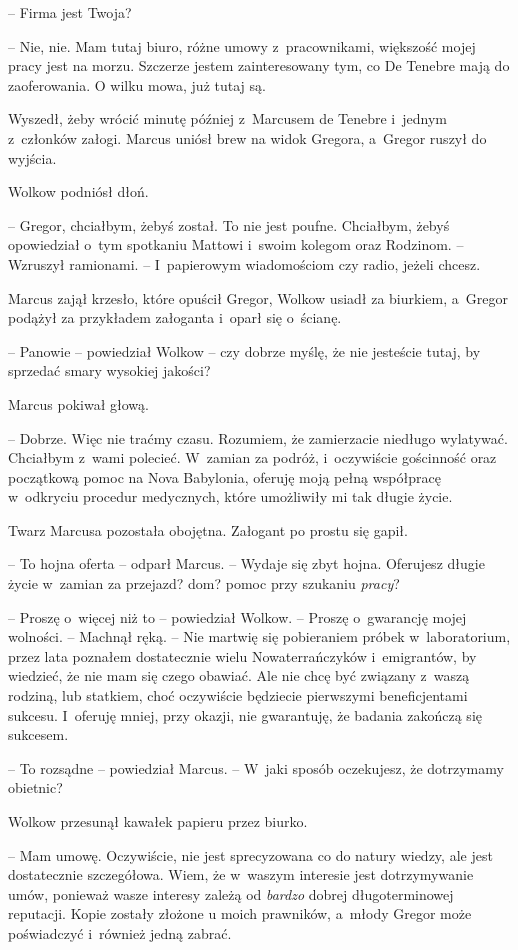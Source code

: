 \documentclass[oneside,polish,12pt,sfheadings]{mwbk}
\begin{document}
-- Firma jest Twoja?

-- Nie, nie. Mam tutaj biuro, różne umowy z~pracownikami, większość
mojej pracy jest na morzu. Szczerze jestem zainteresowany tym, co De
Tenebre mają do zaoferowania. O wilku mowa, już tutaj są.

Wyszedł, żeby wrócić minutę później z~Marcusem de Tenebre i~jednym z~członków załogi. Marcus uniósł brew na widok Gregora, a~Gregor ruszył do
wyjścia.

Wolkow podniósł dłoń. 

-- Gregor, chciałbym, żebyś został. To nie jest
poufne. Chciałbym, żebyś opowiedział o~tym spotkaniu Mattowi i~swoim
kolegom oraz Rodzinom. -- Wzruszył ramionami. -- I~papierowym wiadomościom
czy radio, jeżeli chcesz.

Marcus zajął krzesło, które opuścił Gregor, Wolkow usiadł za biurkiem, a~Gregor podążył za przykładem załoganta i~oparł się o~ścianę.

-- Panowie -- powiedział Wolkow -- czy dobrze myślę, że nie jesteście
tutaj, by sprzedać smary wysokiej jakości?

Marcus pokiwał głową.

-- Dobrze. Więc nie traćmy czasu. Rozumiem, że zamierzacie niedługo
wylatywać. Chciałbym z~wami polecieć. W~zamian za podróż, i~oczywiście
gościnność oraz początkową pomoc na Nova Babylonia, oferuję moją pełną
współpracę w~odkryciu procedur medycznych, które umożliwiły mi tak
długie życie.

Twarz Marcusa pozostała obojętna. Załogant po prostu się gapił.

-- To hojna oferta -- odparł Marcus. -- Wydaje się zbyt hojna. Oferujesz
długie życie w~zamian za przejazd? dom? pomoc przy szukaniu
\emph{pracy}?

-- Proszę o~więcej niż to -- powiedział Wolkow. -- Proszę o~gwarancję mojej
wolności. -- Machnął ręką. -- Nie martwię się pobieraniem próbek w~laboratorium, przez lata poznałem dostatecznie wielu Nowaterrańczyków i~emigrantów, by wiedzieć, że nie mam się czego obawiać. Ale nie chcę być
związany z~waszą rodziną, lub statkiem, choć oczywiście będziecie
pierwszymi beneficjentami sukcesu. I~oferuję mniej, przy okazji, nie
gwarantuję, że badania zakończą się sukcesem.

-- To rozsądne -- powiedział Marcus. -- W~jaki sposób oczekujesz, że
dotrzymamy obietnic?

Wolkow przesunął kawałek papieru przez biurko. 

-- Mam umowę. Oczywiście,
nie jest sprecyzowana co do natury wiedzy, ale jest dostatecznie
szczegółowa. Wiem, że w~waszym interesie jest dotrzymywanie umów,
ponieważ wasze interesy zależą od \emph{bardzo} dobrej długoterminowej
reputacji. Kopie zostały złożone u moich prawników, a~młody Gregor może
poświadczyć i~również jedną zabrać.
\end{document}
